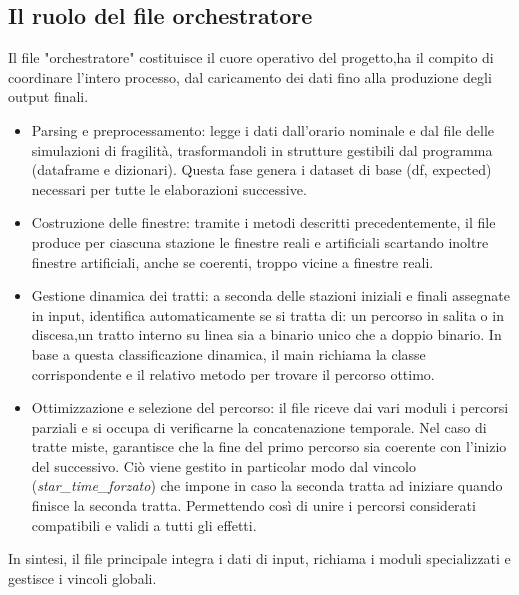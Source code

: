 \documentclass[a4paper,12pt]{report}
\begin{document}
\subsection{Il ruolo del file orchestratore}
Il file "orchestratore" costituisce il cuore operativo del progetto,ha il compito di coordinare l’intero processo, dal caricamento dei dati fino alla produzione degli output finali.
\begin{itemize}
\item  Parsing e preprocessamento: legge i dati dall’orario nominale e dal file delle simulazioni di fragilità, trasformandoli in strutture gestibili dal programma (dataframe e dizionari). Questa fase genera i dataset di base (df, expected) necessari per tutte le elaborazioni successive.

\item  Costruzione delle finestre: tramite i metodi descritti precedentemente, il file produce per ciascuna stazione le finestre reali e artificiali scartando inoltre finestre artificiali, anche se coerenti, troppo vicine a finestre reali.

\item Gestione dinamica dei tratti: a seconda delle stazioni iniziali e finali assegnate in input, identifica automaticamente se si tratta di: un percorso in salita o in discesa,un tratto interno su linea sia a binario unico che a doppio binario. In base a questa classificazione dinamica, il main richiama la classe corrispondente e il relativo metodo per trovare il percorso ottimo.


\item Ottimizzazione e selezione del percorso: il file riceve dai vari moduli i percorsi parziali e si occupa di verificarne la concatenazione temporale. Nel caso di tratte miste, garantisce che la fine del primo percorso sia coerente con l’inizio del successivo. Ciò viene gestito in particolar modo dal vincolo (\textit{star\_time\_forzato}) che impone in caso la seconda tratta ad iniziare quando finisce la seconda tratta. Permettendo così di unire i percorsi considerati compatibili e validi a tutti gli effetti.  
\end{itemize}
In sintesi, il file principale integra i dati di input, richiama i moduli specializzati e gestisce i vincoli globali.
\end{document}
